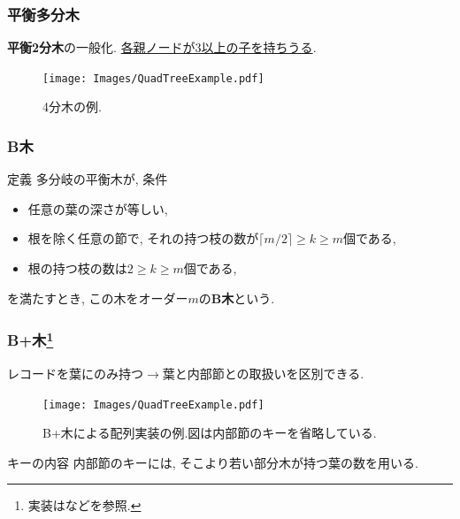 \documentclass[10pt]{beamer}
\begin{document}
\begin{frame}
    \frametitle{平衡多分木}

    \textbf{平衡2分木}の一般化.\vspace{1em}
    \underline{各親ノードが3以上の子を持ちうる}.

    \begin{figure}
        \texttt{[image: Images/QuadTreeExample.pdf]}
        \caption{4分木の例.}
    \end{figure}

\end{frame}
\begin{frame}
    \frametitle{B木}

    \begin{block}{定義}
        多分岐の平衡木が, 条件
        \begin{itemize}
            \item 任意の葉の深さが等しい,
            \item 根を除く任意の節で, それの持つ枝の数が$\lceil m/2\rceil \ge k\ge m$個である,
            \item 根の持つ枝の数は$2\ge k \ge m$個である,
        \end{itemize}
        を満たすとき, この木をオーダー$m$の\textbf{B木}という.
    \end{block}

\end{frame}
\begin{frame}
    \frametitle{B+木\footnote{実装は\cite{kondo:2011}などを参照.}}

    レコードを葉にのみ持つ$\longrightarrow$葉と内部節との取扱いを区別できる.
    \begin{figure}
        \texttt{[image: Images/QuadTreeExample.pdf]}
        \caption{B+木による配列実装の例.図は内部節のキーを省略している.}
    \end{figure}

    \begin{alertblock}{キーの内容}
        内部節のキーには, そこより若い部分木が持つ葉の数を用いる.
    \end{alertblock}

\end{frame}
\end{document}
